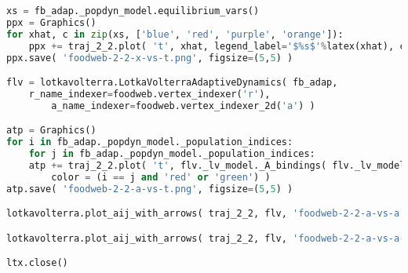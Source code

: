 \begin{lstlisting}[language=Python]
xs = fb_adap._popdyn_model.equilibrium_vars()
ppx = Graphics()
for xhat, c in zip(xs, ['blue', 'red', 'purple', 'orange']):
    ppx += traj_2_2.plot( 't', xhat, legend_label='$%s$'%latex(xhat), color=c )
ppx.save( 'foodweb-2-2-x-vs-t.png', figsize=(5,5) )

flv = lotkavolterra.LotkaVolterraAdaptiveDynamics( fb_adap,
	r_name_indexer=foodweb.vertex_indexer('r'),
        a_name_indexer=foodweb.vertex_indexer_2d('a') )

atp = Graphics()
for i in fb_adap._popdyn_model._population_indices:
    for j in fb_adap._popdyn_model._population_indices:
	atp += traj_2_2.plot( 't', flv._lv_model._A_bindings( flv._lv_model._a_indexer[i][j] ),
	    color = (i == j and 'red' or 'green') )
atp.save( 'foodweb-2-2-a-vs-t.png', figsize=(5,5) )

lotkavolterra.plot_aij_with_arrows( traj_2_2, flv, 'foodweb-2-2-a-vs-a.png' )

lotkavolterra.plot_aij_with_arrows( traj_2_2, flv, 'foodweb-2-2-a-vs-a-detail.png', xmin=-1.993, xmax=-1.9925, ymin=1.79325, ymax=1.79375 )

ltx.close()
\end{lstlisting}
